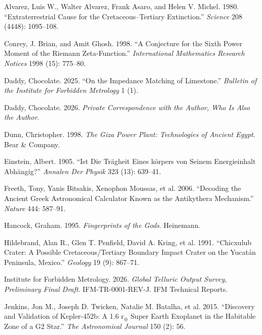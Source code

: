 \documentclass[
  english,
  11pt,
  letterpaper,
]{scrbook}
\newlength{\cslhangindent}
\newenvironment{CSLReferences}[2] %
 {\begin{list}{}{%
  \setlength{\itemindent}{0pt}
  \setlength{\leftmargin}{0pt}
  \setlength{\parsep}{0pt}
  \ifodd #1
   \setlength{\leftmargin}{\cslhangindent}
   \setlength{\itemindent}{-1\cslhangindent}
  \fi
  \setlength{\itemsep}{#2\baselineskip}}}
 {\end{list}}
\begin{document}
\protect{}\label{refs}
\begin{CSLReferences}{1}{1}
Alvarez, Luis W., Walter Alvarez, Frank Asaro, and Helen V. Michel.
1980. {``Extraterrestrial Cause for the Cretaceous--Tertiary
Extinction.''} \emph{Science} 208 (4448): 1095--108.

Conrey, J. Brian, and Amit Ghosh. 1998. {``A Conjecture for the Sixth
Power Moment of the Riemann Zeta-Function.''} \emph{International
Mathematics Research Notices} 1998 (15): 775--80.

Daddy, Chocolate. 2025. {``On the Impedance Matching of Limestone.''}
\emph{Bulletin of the Institute for Forbidden Metrology} 1 (1).

Daddy, Chocolate. 2026. \emph{Private Correspondence with the Author,
Who Is Also the Author}.

Dunn, Christopher. 1998. \emph{The Giza Power Plant: Technologies of
Ancient Egypt}. Bear \& Company.

Einstein, Albert. 1905. {``Ist Die Tr{ä}gheit Eines k{ö}rpers von Seinem
Energieinhalt Abh{ä}ngig?''} \emph{Annalen Der Physik} 323 (13):
639--41.

{Freeth, Tony, Yanis Bitsakis, Xenophon Moussas, et al.} 2006.
{``Decoding the Ancient Greek Astronomical Calculator Known as the
Antikythera Mechanism.''} \emph{Nature} 444: 587--91.

Hancock, Graham. 1995. \emph{Fingerprints of the Gods}. Heinemann.

{Hildebrand, Alan R., Glen T. Penfield, David A. Kring, et al.} 1991.
{``Chicxulub Crater: A Possible Cretaceous/Tertiary Boundary Impact
Crater on the Yucat{á}n Peninsula, Mexico.''} \emph{Geology} 19 (9):
867--71.

Institute for Forbidden Metrology. 2026. \emph{Global Telluric Output
Survey, Preliminary Final Draft}. IFM-TR-0001-REV-J. IFM Technical
Reports.

{Jenkins, Jon M., Joseph D. Twicken, Natalie M. Batalha, et al.} 2015.
{``Discovery and Validation of Kepler-452b: A 1.6 r\(_\oplus\) Super
Earth Exoplanet in the Habitable Zone of a G2 Star.''} \emph{The
Astronomical Journal} 150 (2): 56.


\end{CSLReferences}
\end{document}
